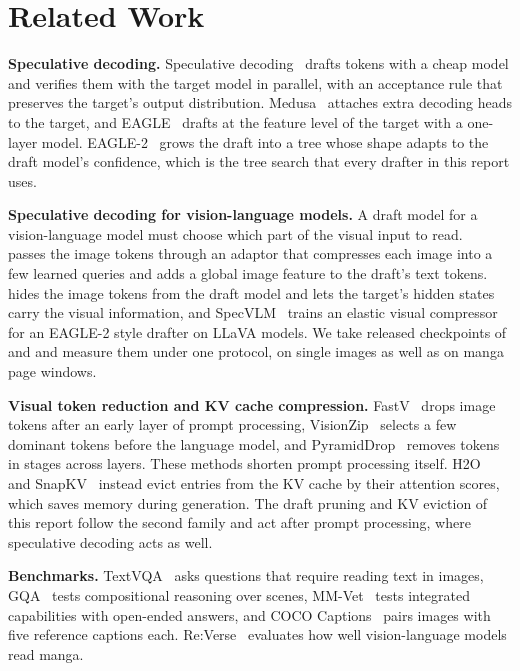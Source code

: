 \section{Related Work}
\label{sec:related}

\noindent{}\textbf{Speculative decoding.} 
Speculative decoding~\cite{leviathan2023fast,chen2023accelerating} drafts tokens with a cheap model and verifies them with the target model in parallel, with an acceptance rule that preserves the target's output distribution.
Medusa~\cite{cai2024medusa} attaches extra decoding heads to the target, and EAGLE~\cite{li2024eagle} drafts at the feature level of the target with a one-layer model.
EAGLE-2~\cite{li2024eagle2} grows the draft into a tree whose shape adapts to the draft model's confidence, which is the tree search that every drafter in this report uses.

\noindent{}\textbf{Speculative decoding for vision-language models.} 
A draft model for a vision-language model must choose which part of the visual input to read.
\vispec~\cite{kang2025vispec} passes the image tokens through an adaptor that compresses each image into a few learned queries and adds a global image feature to the draft's text tokens.
\hivis~\cite{xie2025hivis} hides the image tokens from the draft model and lets the target's hidden states carry the visual information, and SpecVLM~\cite{huang2025specvlm} trains an elastic visual compressor for an EAGLE-2 style drafter on LLaVA models.
We take released checkpoints of \vispec and \hivis and measure them under one protocol, on single images as well as on manga page windows.

\noindent\textbf{Visual token reduction and KV cache compression.}
FastV~\cite{chen2024fastv} drops image tokens after an early layer of prompt processing, VisionZip~\cite{yang2025visionzip} selects a few dominant tokens before the language model, and PyramidDrop~\cite{xing2025pyramiddrop} removes tokens in stages across layers.
These methods shorten prompt processing itself.
H2O~\cite{zhang2023h2o} and SnapKV~\cite{li2024snapkv} instead evict entries from the KV cache by their attention scores, which saves memory during generation.
The draft pruning and KV eviction of this report follow the second family and act after prompt processing, where speculative decoding acts as well.

\noindent\textbf{Benchmarks.}
TextVQA~\cite{singh2019textvqa} asks questions that require reading text in images, GQA~\cite{hudson2019gqa} tests compositional reasoning over scenes, MM-Vet~\cite{yu2024mmvet} tests integrated capabilities with open-ended answers, and COCO Captions~\cite{chen2015coco} pairs images with five reference captions each.
Re:Verse~\cite{baranwal2025reverse} evaluates how well vision-language models read manga.
